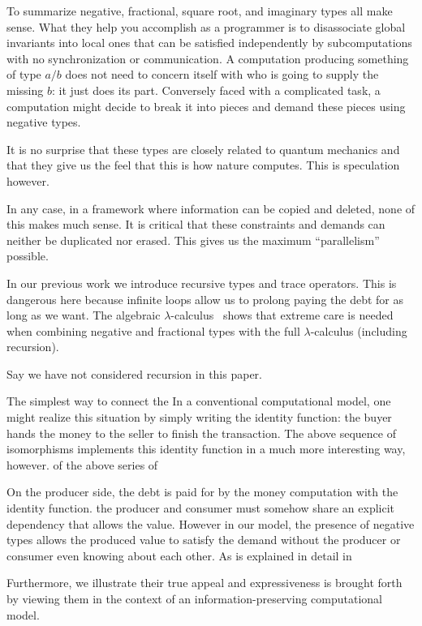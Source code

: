\documentclass[preprint]{sigplanconf}
\begin{document}
{To summarize negative, fractional, square root, and imaginary types all make
sense. What they help you accomplish as a programmer is to disassociate
global invariants into local ones that can be satisfied independently by
subcomputations with no synchronization or communication. A computation
producing something of type $a/b$ does not need to concern itself with who is
going to supply the missing $b$: it just does its part. Conversely faced with
a complicated task, a computation might decide to break it into pieces and
demand these pieces using negative types. 

It is no surprise that these types are closely related to quantum mechanics
and that they give us the feel that this is how nature computes. This is
speculation however.

In any case, in a framework where information can be copied and deleted, none
of this makes much sense. It is critical that these constraints and demands
can neither be duplicated nor erased.  This gives us the maximum
``parallelism'' possible.

In our previous work we introduce recursive types and trace operators. This
is dangerous here because infinite loops allow us to prolong paying the debt
for as long as we want. The algebraic
$\lambda$-calculus~\cite{Vaux:2009:ALC:1630585.1630590} shows that extreme
care is needed when combining negative and fractional types with the full
$\lambda$-calculus (including recursion).

Say we have not considered recursion in this paper.

The simplest way to connect the In a conventional computational model, one
might realize this situation by simply writing the identity function: the
buyer hands the money to the seller to finish the transaction. The above
sequence of isomorphisms implements this identity function in a much more
interesting way, however.  of the above series of

On the producer side, the debt is paid for by the money computation with the
identity function. the producer and consumer must somehow share an explicit
dependency that allows the value. However in our model, the presence of
negative types allows the produced value to satisfy the demand without the
producer or consumer even knowing about each other. As is explained in detail
in

Furthermore, we illustrate their true appeal and expressiveness is brought
forth by viewing them in the context of an information-preserving
computational model.

}
\end{document}
